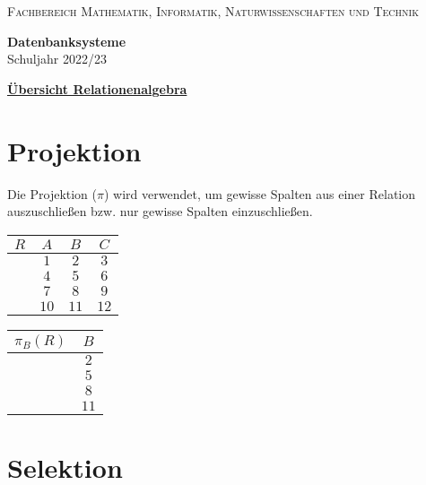 \documentclass[12pt,a4paper,notitlepage,leqno]{article}
\begin{document}
\vspace{0.2cm}
\begin{minipage}[c]{0.5\textwidth}
\begin{center}
\textsc{Fachbereich Mathematik, Informatik, Naturwissenschaften und Technik}
\end{center}
\end{minipage}
\begin{minipage}[c]{0.5\textwidth}
\begin{center}
\textbf{Datenbanksysteme}\\
Schuljahr 2022/23
\end{center}
\end{minipage}

\begin{center}
\textbf{\underline{Übersicht Relationenalgebra}}

\vspace{0.2cm}
\end{center}

\section*{Projektion}

Die Projektion ($\pi$) wird verwendet, um gewisse Spalten aus einer Relation auszuschließen bzw. nur gewisse Spalten einzuschließen.

\begin{center}
    \begin{tabular}{c|ccc}
        $R$ & $A$ & $B$ & $C$ \\\hline
         & $1$ & $2$ & $3$ \\
         & $4$ & $5$ & $6$ \\
         & $7$ & $8$ & $9$ \\
         & $10$ & $11$ & $12$
    \end{tabular}
    \hspace{1cm}
    \begin{tabular}{c|c}
        $\pi_B(R)$ & $B$ \\\hline
         & $2$\\
         & $5$\\
         & $8$\\
         & $11$\\
    \end{tabular}
\end{center}

\section*{Selektion}
\end{document}
